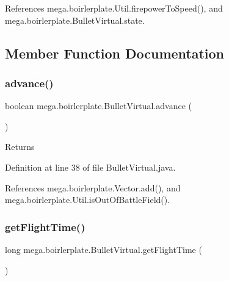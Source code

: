 References mega.\+boirlerplate.\+Util.\+firepower\+To\+Speed(), and mega.\+boirlerplate.\+Bullet\+Virtual.\+state.



\subsection{Member Function Documentation}
\mbox{\label{classmega_1_1boirlerplate_1_1_bullet_virtual_a819d02c4c82ced2c21a77d79e0cfa603}} 
\subsubsection{\texorpdfstring{advance()}{advance()}}
{\footnotesize\ttfamily boolean mega.\+boirlerplate.\+Bullet\+Virtual.\+advance (\begin{DoxyParamCaption}{ }\end{DoxyParamCaption})}

\begin{DoxyReturn}{Returns}

\end{DoxyReturn}


Definition at line 38 of file Bullet\+Virtual.\+java.



References mega.\+boirlerplate.\+Vector.\+add(), and mega.\+boirlerplate.\+Util.\+is\+Out\+Of\+Battle\+Field().

\mbox{\label{classmega_1_1boirlerplate_1_1_bullet_virtual_ae3d0a123374d39d056414c0916bff3c6}} 
\subsubsection{\texorpdfstring{get\+Flight\+Time()}{getFlightTime()}}
{\footnotesize\ttfamily long mega.\+boirlerplate.\+Bullet\+Virtual.\+get\+Flight\+Time (\begin{DoxyParamCaption}{ }\end{DoxyParamCaption})}

